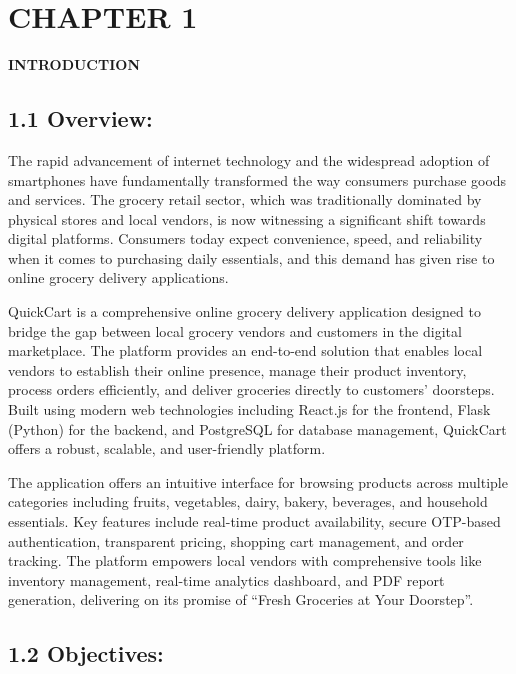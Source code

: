 \documentclass[12pt,a4paper]{report}
\begin{document}
\setcounter{page}{9}

\chapter*{CHAPTER 1}

\begin{center}
    \textbf{\large INTRODUCTION}
\end{center}

\section*{1.1 Overview:}

The rapid advancement of internet technology and the widespread adoption of smartphones have fundamentally transformed the way consumers purchase goods and services. The grocery retail sector, which was traditionally dominated by physical stores and local vendors, is now witnessing a significant shift towards digital platforms. Consumers today expect convenience, speed, and reliability when it comes to purchasing daily essentials, and this demand has given rise to online grocery delivery applications.

QuickCart is a comprehensive online grocery delivery application designed to bridge the gap between local grocery vendors and customers in the digital marketplace. The platform provides an end-to-end solution that enables local vendors to establish their online presence, manage their product inventory, process orders efficiently, and deliver groceries directly to customers' doorsteps. Built using modern web technologies including React.js for the frontend, Flask (Python) for the backend, and PostgreSQL for database management, QuickCart offers a robust, scalable, and user-friendly platform.

The application offers an intuitive interface for browsing products across multiple categories including fruits, vegetables, dairy, bakery, beverages, and household essentials. Key features include real-time product availability, secure OTP-based authentication, transparent pricing, shopping cart management, and order tracking. The platform empowers local vendors with comprehensive tools like inventory management, real-time analytics dashboard, and PDF report generation, delivering on its promise of ``Fresh Groceries at Your Doorstep''.

\section*{1.2 Objectives:}
\end{document}
